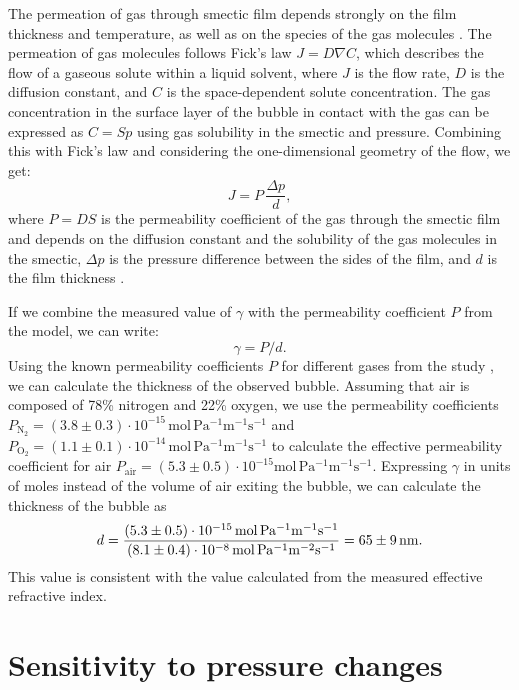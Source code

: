 \documentclass[a4paper,12pt]{article}
\begin{document}
The permeation of gas through smectic film depends strongly on the film thickness and temperature, as well as on the species of the gas molecules \cite{ishii2009gas, li2002gas}.
The permeation of gas molecules follows Fick's law $J=D\nabla C$, which describes the flow of a gaseous solute within a liquid solvent, where $J$ is the flow rate, $D$ is the diffusion constant, and $C$ is the space-dependent solute concentration.
The gas concentration in the surface layer of the bubble in contact with the gas can be expressed as $C=Sp$ using gas solubility in the smectic and pressure.
Combining this with Fick's law and considering the one-dimensional geometry of the flow, we get:
\begin{equation}
	J=P\,\frac{\Delta p}{d},
\end{equation}
where $P=DS$ is the permeability coefficient of the gas through the smectic film and depends on the diffusion constant and the solubility of the gas molecules in the smectic, $\Delta p$ is the pressure difference between the sides of the film, and $d$ is the film thickness \cite{ishii2009gas}.

If we combine the measured value of $\gamma$ with the permeability coefficient $P$ from the model, we can write:
\begin{equation}
	\gamma=P/d.
\end{equation}
Using the known permeability coefficients $P$ for different gases from the study \cite{ishii2009gas}, we can calculate the thickness of the observed bubble.
Assuming that air is composed of 78\% nitrogen and 22\% oxygen, we use the permeability coefficients $P_{\mathrm{N_2}}=(3.8\pm0.3)\cdot 10^{-15}\,\mathrm{mol\,Pa^{-1}m^{-1}s^{-1}}$ and $P_{\mathrm{O_2}}=(1.1\pm0.1)\cdot 10^{-14}\,\mathrm{mol\,Pa^{-1}m^{-1}s^{-1}}$ to calculate the effective permeability coefficient for air $P_{\mathrm{air}}=(5.3\pm0.5)\cdot 10^{-15}\mathrm{mol\,Pa^{-1}m^{-1}s^{-1}}$.
Expressing $\gamma$ in units of moles instead of the volume of air exiting the bubble, we can calculate the thickness of the bubble as
\begin{equation}
	d=\frac{(5.3\pm0.5)\cdot 10^{-15}\,\mathrm{mol\,Pa^{-1}m^{-1}s^{-1}}}{(8.1\pm0.4)\cdot 10^{-8}\,\mathrm{mol\,Pa^{-1}m^{-2}s^{-1}}}= \SI{65\pm9}{nm}.
\end{equation}
This value is consistent with the value calculated from the measured effective refractive index.

\clearpage	




\section{Sensitivity to pressure changes}
\end{document}
